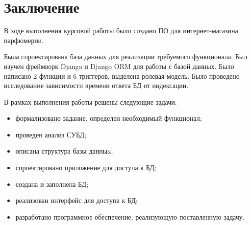 \chapter*{Заключение}

В ходе выполнения курсовой работы было создано ПО для интернет-магазина парфюмерии.

Была спроектирована база данных для реализации требуемого функционала. Был изучен фреймворк Django и Django ORM для работы с базой данных. Было написано 2 функции и 6 триггеров, выделена ролевая модель. Было проведено исследование зависимости времени ответа БД от индексации.

В рамках выполнения работы решены следующие задачи:
\begin{itemize}
	\item формализовано задание, определен необходимый функционал;
	\item проведен анализ СУБД;
	\item описана структура базы данныx;
	\item спроектировано приложение для доступа к БД;
	\item создана и заполнена БД;
	\item реализован интерфейс для доступа к БД;
	\item разработано программное обеспечение, реализующую поставленную задачу.
\end{itemize}
